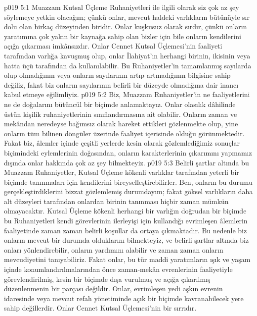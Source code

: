 \vs p019 5:1 Muazzam Kutsal Üçleme Ruhaniyetleri ile ilgili olarak siz çok az şey söylemeye yetkin olacağım; çünkü onlar, mevcut haldeki varlıkların bütünüyle sır dolu olan birkaç düzeyinden biridir. Onlar kuşkusuz olarak sırdır, çünkü onların yaratımına çok yakın bir kaynağa sahip olan bizler için bile onların kendilerini açığa çıkarması imkânsızdır. Onlar Cennet Kutsal Üçlemesi’nin faaliyeti tarafından varlığa kavuşmuş olup, onlar İlahiyat’ın herhangi birinin, ikisinin veya hatta üçü tarafından da kullanılabilir. Bu Ruhaniyetler’in tamamlanmış sayılarda olup olmadığının veya onların sayılarının artıp artmadığının bilgisine sahip değiliz, fakat biz onların sayılarının belirli bir düzeyde olmadığına dair inancı kabul etmeye eğilimliyiz.
\vs p019 5:2 Biz, Muazzam Ruhaniyetler’in ne faaliyetlerini ne de doğalarını bütüncül bir biçimde anlamaktayız. Onlar olasılık dâhilinde üstün kişilik ruhaniyetlerinin sınıflandırmasına ait olabilir. Onların zaman ve mekândan neredeyse bağımsız olarak hareket ettikleri gözlenmekte olup, yine onların tüm bilinen döngüler üzerinde faaliyet içerisinde olduğu görünmektedir. Fakat biz, âlemler içinde çeşitli yerlerde kesin olarak gözlemlediğimiz sonuçlar biçimindeki eylemlerinin doğasından, onların karakterlerinin çıkarımını yapmamız dışında onlar hakkında çok az şey bilmekteyiz.
\vs p019 5:3 Belirli şartlar altında bu Muazzam Ruhaniyetler, Kutsal Üçleme kökenli varlıklar tarafından yeterli bir biçimde tanınmaları için kendilerini bireyselleştirebilirler. Ben, onların bu durumu gerçekleştirdiklerini bizzat gözlemlemiş durumdayım; fakat göksel varlıkların daha alt düzeyleri tarafından onlardan birinin tanınması hiçbir zaman mümkün olmayacaktır. Kutsal Üçleme kökenli herhangi bir varlığın doğrudan bir biçimde bu Ruhaniyetleri kendi görevlerinin ilerleyişi için kullandığı evrimleşen âlemlerin faaliyetinde zaman zaman belirli koşullar da ortaya çıkmaktadır. Bu nedenle biz onların mevcut bir durumda olduklarını bilmekteyiz, ve belirli şartlar altında biz onları yönlendirebilir, onların yardımını alabilir ve zaman zaman onların mevcudiyetini tanıyabiliriz. Fakat onlar, bu tür maddi yaratımların ışık ve yaşam içinde konumlandırılmalarından önce zaman\hyp{}mekân evrenlerinin faaliyetiyle görevlendirilmiş, kesin bir biçimde dışa vurulmuş ve açığa çıkarılmış düzenlenmenin bir parçası değildir. Onlar, evrimleşen yedi aşkın evrenin idaresinde veya mevcut refah yönetiminde açık bir biçimde kavranabilecek yere sahip değillerdir. Onlar Cennet Kutsal Üçlemesi’nin bir sırrıdır.
